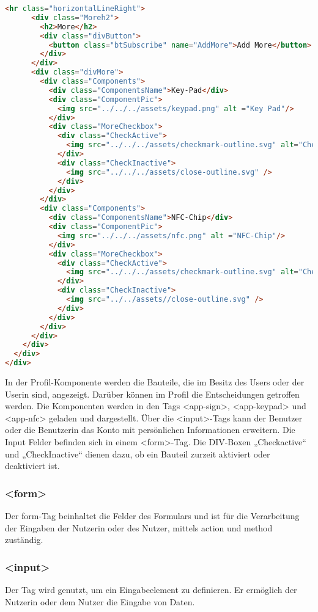 \begin{lstlisting}[language=html, caption=Profil Komponente]
      <hr class="horizontalLineRight">
      <div class="Moreh2">
        <h2>More</h2>
        <div class="divButton">
          <button class="btSubscribe" name="AddMore">Add More</button>
        </div>
      </div>
      <div class="divMore">
        <div class="Components">
          <div class="ComponentsName">Key-Pad</div>
          <div class="ComponentPic">
            <img src="../../../assets/keypad.png" alt ="Key Pad"/>
          </div>
          <div class="MoreCheckbox">
            <div class="CheckActive">
              <img src="../../../assets/checkmark-outline.svg" alt="Checkmark" />
            </div>
            <div class="CheckInactive">
              <img src="../../../assets/close-outline.svg" />
            </div>
          </div>
        </div>
        <div class="Components">
          <div class="ComponentsName">NFC-Chip</div>
          <div class="ComponentPic">
            <img src="../../../assets/nfc.png" alt ="NFC-Chip"/>
          </div>
          <div class="MoreCheckbox">
            <div class="CheckActive">
              <img src="../../../assets/checkmark-outline.svg" alt="Checkmark" />
            </div>
            <div class="CheckInactive">
              <img src="../../assets//close-outline.svg" />
            </div>
          </div>
        </div>
      </div>
    </div>
  </div>
</div>
\end{lstlisting}

In der Profil-Komponente werden die Bauteile, die im Besitz des Users oder der Userin sind, angezeigt. Darüber können im Profil die Entscheidungen getroffen werden. Die Komponenten werden in den Tags <app-sign>, <app-keypad> und <app-nfc> geladen und dargestellt. Über die <input>-Tags kann der Benutzer oder die Benutzerin das Konto mit persönlichen Informationen erweitern. Die Input Felder befinden sich in einem <form>-Tag. Die DIV-Boxen „Checkactive“ und „CheckInactive“ dienen dazu, ob ein Bauteil zurzeit aktiviert oder deaktiviert ist.

\subsubsection{<form>}
Der form-Tag beinhaltet die Felder des Formulars und ist für die Verarbeitung der Eingaben der Nutzerin oder des Nutzer, mittels action und method zuständig.
\cite{Form}

\subsubsection{<input>}
Der Tag wird genutzt, um ein Eingabeelement zu definieren. Er ermöglich der Nutzerin oder dem Nutzer die Eingabe von Daten.
\cite{InputTag}


